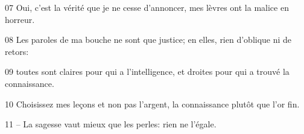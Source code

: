 
07 Oui, c’est la vérité que je ne cesse d’annoncer, mes lèvres ont la malice en horreur.

08 Les paroles de ma bouche ne sont que justice; en elles, rien d’oblique ni de retors:

09 toutes sont claires pour qui a l’intelligence, et droites pour qui a trouvé la connaissance.

10 Choisissez mes leçons et non pas l’argent, la connaissance plutôt que l’or fin.

11 – La sagesse vaut mieux que les perles: rien ne l’égale.
